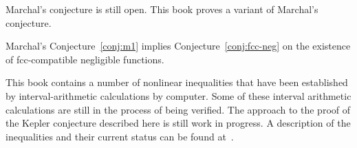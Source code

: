 Marchal's conjecture is still open.  This book proves a variant of
Marchal's conjecture.

\begin{theorem}\label{theorem:mk1}
Marchal's Conjecture~\ref{conj:m1} implies
Conjecture~\ref{conj:fcc-neg} on the existence of fcc-compatible
negligible functions.
\end{theorem}

\begin{note}%
This book contains a number of nonlinear inequalities that have been
established by interval-arithmetic calculations by computer.  Some
of these interval arithmetic calculations are still in the process
of being verified.  The approach to the proof of the Kepler
conjecture described here is still work in progress.  A description
of the inequalities and their current status can be found
at~\cite{hales:2009:nonlinear}.
\end{note}

